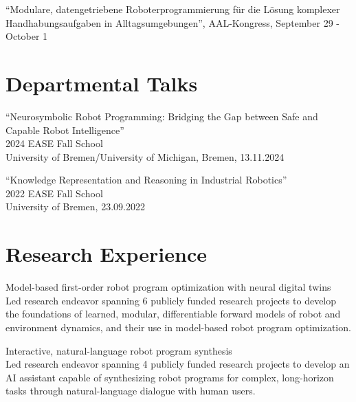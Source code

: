 \documentclass[11pt]{article} %
\begin{document}
``Modulare, datengetriebene Roboterprogrammierung für die Lösung komplexer Handhabungsaufgaben in Alltagsumgebungen'', AAL-Kongress, September 29 - October 1

\section*{Departmental Talks}

``Neurosymbolic Robot Programming: Bridging the Gap between Safe and Capable Robot Intelligence''\\
2024 EASE Fall School\\
University of Bremen/University of Michigan, Bremen, 13.11.2024

\medskip

``Knowledge Representation and Reasoning in Industrial Robotics''\\
2022 EASE Fall School\\
University of Bremen, 23.09.2022





\section*{Research Experience}

Model-based first-order robot program optimization with neural digital twins\\
Led research endeavor spanning 6 publicly funded research projects to develop the foundations
of learned, modular, differentiable forward models of robot and environment dynamics, and their
use in model-based robot program optimization.

Interactive, natural-language robot program synthesis\\
Led research endeavor spanning 4 publicly funded research projects to develop an AI assistant
capable of synthesizing robot programs for complex, long-horizon tasks through natural-language dialogue
with human users.
\end{document}
